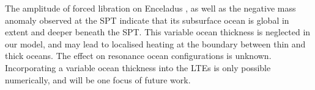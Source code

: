 The amplitude of forced libration on Enceladus \citep{thomas2015enceladus}, as well as the negative mass anomaly observed at the SPT \citep{iess2014gravity, mckinnon2015effect} indicate that its subsurface ocean is global in extent and deeper beneath the SPT. This variable ocean thickness is neglected in our model, and may lead to localised heating at the boundary between thin and thick oceans. The effect on resonance ocean configurations is unknown. Incorporating a variable ocean thickness into the LTEs is only possible numerically, and will be one focus of future work.


